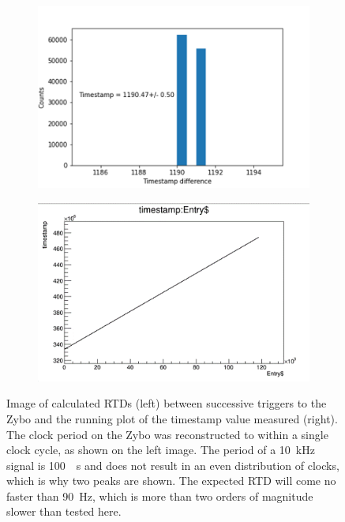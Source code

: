 \begin{figure}[]
\centering
\begin{subfigure}{.5\textwidth}
  \centering
  \includegraphics[width=\textwidth]{images/zybo_10khz_timestamp_frequency_calibration.png}
  \caption{}
\end{subfigure}%
\begin{subfigure}{.5\textwidth}
  \centering
  \includegraphics[width=\textwidth]{images/zybo_10khz_timestamp_graph.png}
  \caption{}
\end{subfigure}
\caption{Image of calculated RTDs (left) between successive triggers to the Zybo and the running plot of the timestamp value measured (right).
The clock period on the Zybo was reconstructed to within a single clock cycle, as shown on the left image.
The period of a 10~\unit{kHz} signal is 100~\unit{\mu s} and does not result in an even distribution of clocks, which is why two peaks are shown.
The expected RTD will come no faster than 90~\unit{Hz}, which is more than two orders of magnitude slower than tested here.
}
\label{fig:frequency_reconstruction}
\end{figure}

